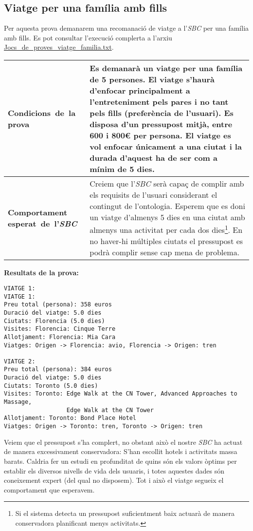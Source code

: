 \documentclass[11pt,a4paper]{article}
\begin{document}
\subsection{Viatge per una família amb fills}
Per aquesta prova demanarem una recomanació de viatge a l'\emph{SBC} per una família amb fills. Es pot consultar l'execució complerta a l'arxiu \url{Jocs_de_proves_viatge_familia.txt}. \\

\noindent
\begin{tabular}{|p{}|p{}|}
\hline
\textbf{\mbox{Condicions de la} \mbox{prova}} & Es demanarà un viatge per una família de 5 persones. El viatge s'haurà d'enfocar principalment a l'entreteniment pels pares i no tant pels fills (preferència de l'usuari). Es disposa d'un pressupost mitjà, entre 600 i 800\euro{} per persona. El viatge es vol enfocar únicament a una ciutat i la durada d'aquest ha de ser com a mínim de 5 dies. \\
\hline
\textbf{Comportament \mbox{esperat de l'\emph{SBC}}} & Creiem que l'\emph{SBC} serà capaç de complir amb els requisits de l'usuari considerant el contingut de l'ontologia. Esperem que es doni un viatge d'almenys 5 dies en una ciutat amb almenys una activitat per cada dos dies\footnote{Si el sistema detecta un pressupost suficientment baix actuarà de manera conservadora planificant menys activitats.}. En no haver-hi múltiples ciutats el pressupost es podrà complir sense cap mena de problema. \\
\hline
\end{tabular}
\bigskip

\textbf{Resultats de la prova:}
\begin{lstlisting}VIATGE 1:
VIATGE 1:
Preu total (persona): 358 euros
Duració del viatge: 5.0 dies
Ciutats: Florencia (5.0 dies)
Visites: Florencia: Cinque Terre
Allotjament: Florencia: Mia Cara
Viatges: Origen -> Florencia: avio, Florencia -> Origen: tren

VIATGE 2:
Preu total (persona): 384 euros
Duració del viatge: 5.0 dies
Ciutats: Toronto (5.0 dies)
Visites: Toronto: Edge Walk at the CN Tower, Advanced Approaches to Massage, 
                  Edge Walk at the CN Tower
Allotjament: Toronto: Bond Place Hotel
Viatges: Origen -> Toronto: tren, Toronto -> Origen: tren
\end{lstlisting} 

Veiem que el pressupost s'ha complert, no obstant això el nostre \emph{SBC} ha actuat de manera excessivament conservadora: S'han escollit hotels i activitats massa barats. Caldria fer un estudi en profunditat de quins són els valors òptims per establir els diversos nivells de vida dels usuaris, i totes aquestes dades són coneixement expert (del qual no disposem). Tot i això el viatge segueix el comportament que esperavem.
\end{document}
